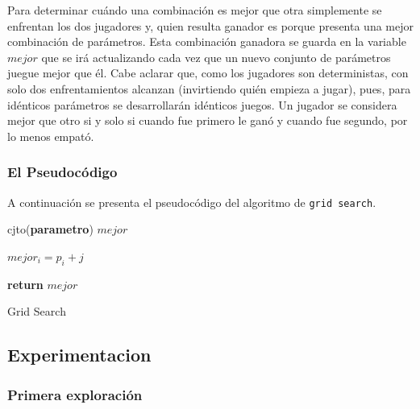 \documentclass[A4paper,oneside,fleqn,11pt]{article}
\theoremstyle{definition}
\begin{document}
Para determinar cuándo una combinación es mejor que otra simplemente se enfrentan los dos jugadores y, quien resulta ganador es porque presenta una mejor combinación de parámetros. Esta combinación ganadora se guarda en la variable $mejor$ que se irá actualizando cada vez que un nuevo conjunto de parámetros juegue mejor que él. Cabe aclarar que, como los jugadores son deterministas, con solo dos enfrentamientos alcanzan (invirtiendo quién empieza a jugar), pues, para idénticos parámetros se desarrollarán idénticos juegos. Un jugador se considera mejor que otro si y solo si cuando fue primero le ganó y cuando fue segundo, por lo menos empató.
 
\subsubsection{El Pseudocódigo}

A continuación se presenta el pseudocódigo del algoritmo de \texttt{grid search}.

\begin{algorithm}



cjto(\textbf{parametro}) $mejor$


	{

	
		{
		
		
			{
			
			$mejor_i = p_i +j$
			
			}
	
		}

	}

\textbf{return} $mejor$

\caption{Grid Search}
\end{algorithm}

\subsection{Experimentacion}

\subsubsection{Primera exploración}
\end{document}
